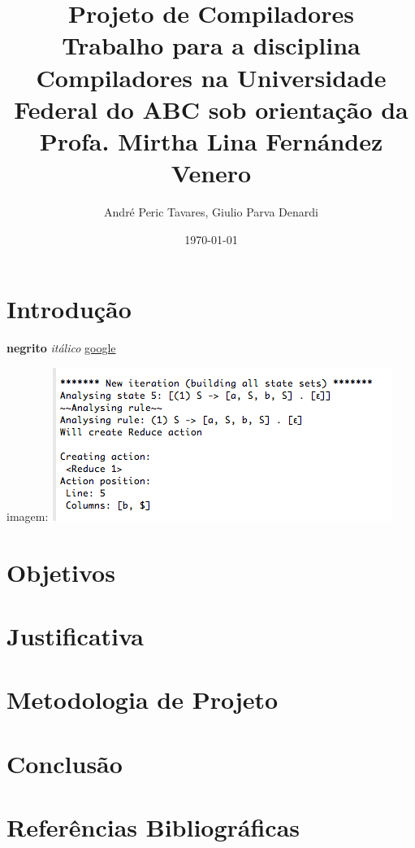 \documentclass[11pt]{article}
\author{André Peric Tavares, Giulio Parva Denardi}
\date{\today}
\title{Projeto de Compiladores\\\medskip
\large Trabalho para a disciplina Compiladores na Universidade Federal do ABC sob orientação da Profa. Mirtha Lina Fernández Venero}
\begin{document}
\maketitle
\tableofcontents


\section{Introdução}
\label{sec:orgheadline1}
\textbf{negrito}
\emph{itálico}
\href{https://google.com}{google}

imagem:
\includegraphics[width=.9\linewidth]{./media/Screenshot 2016-04-25 17.54.18.png}

\section{Objetivos}
\label{sec:orgheadline2}
\section{Justificativa}
\label{sec:orgheadline3}
\section{Metodologia de Projeto}
\label{sec:orgheadline4}
\section{Conclusão}
\label{sec:orgheadline5}
\section{Referências Bibliográficas}
\label{sec:orgheadline6}
\end{document}

